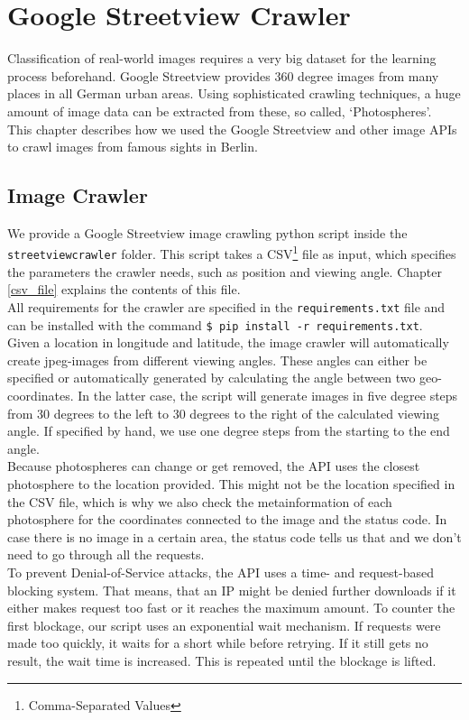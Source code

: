 \section{Google Streetview Crawler}
Classification of real-world images requires a very big dataset for the learning process beforehand. Google Streetview provides 360 degree images from many places in all German urban areas. Using sophisticated crawling techniques, a huge amount of image data can be extracted from these, so called, `Photospheres'.\\
This chapter describes how we used the Google Streetview and other image APIs to crawl images from famous sights in Berlin.

\subsection{Image Crawler}
We provide a Google Streetview image crawling python script inside the\\\texttt{streetviewcrawler} folder. This script takes a CSV\footnote{Comma-Separated Values} file as input, which specifies the parameters the crawler needs, such as position and viewing angle. Chapter \ref{csv_file} explains the contents of this file.\\
All requirements for the crawler are specified in the \texttt{requirements.txt} file and can be installed with the command \texttt{\$ pip install -r requirements.txt}.\\
Given a location in longitude and latitude, the image crawler will automatically create jpeg-images from different viewing angles. These angles can either be specified or automatically generated by calculating the angle between two geo-coordinates. In the latter case, the script will generate images in five degree steps from 30 degrees to the left to 30 degrees to the right of the calculated viewing angle. If specified by hand, we use one degree steps from the starting to the end angle.\\
Because photospheres can change or get removed, the API uses the closest photosphere to the location provided. This might not be the location specified in the CSV file, which is why we also check the metainformation of each photosphere for the coordinates connected to the image and the status code. In case there is no image in a certain area, the status code tells us that and we don't need to go through all the requests.\\
To prevent Denial-of-Service attacks, the API uses a time- and request-based blocking system. That means, that an IP might be denied further downloads if it either makes request too fast or it reaches the maximum amount. To counter the first blockage, our script uses an exponential wait mechanism. If requests were made too quickly, it waits for a short while before retrying. If it still gets no result, the wait time is increased. This is repeated until the blockage is lifted.\\
